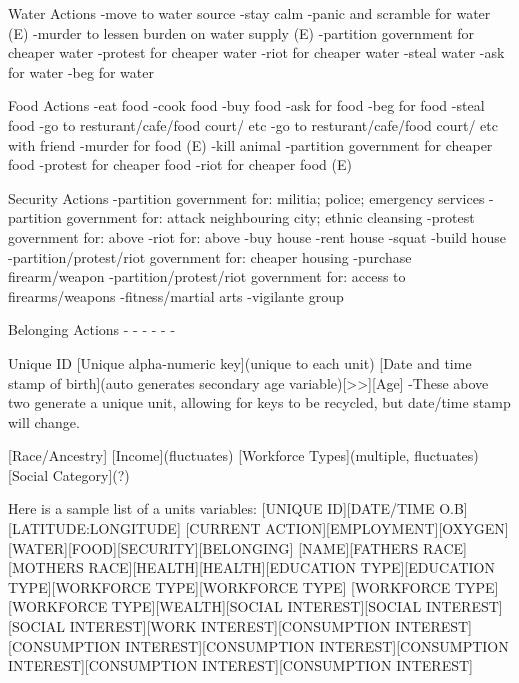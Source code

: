 Water Actions
-move to water source
-stay calm
-panic and scramble for water (E)
-murder to lessen burden on water supply (E)
-partition government for cheaper water
-protest for cheaper water
-riot for cheaper water
-steal water
-ask for water
-beg for water


Food Actions
-eat food
-cook food
-buy food
-ask for food
-beg for food
-steal food 
-go to resturant/cafe/food court/ etc
-go to resturant/cafe/food court/ etc with friend
-murder for food (E)
-kill animal
-partition government for cheaper food
-protest for cheaper food
-riot for cheaper food (E)


Security Actions
-partition government for: militia; police; emergency services
-partition government for: attack neighbouring city; ethnic cleansing
-protest government for: above
-riot for: above
-buy house
-rent house
-squat
-build house
-partition/protest/riot government for: cheaper housing
-purchase firearm/weapon
-partition/protest/riot government for: access to firearms/weapons
-fitness/martial arts
-vigilante group


Belonging Actions
-
-
-
-
-
-








Unique ID
[Unique alpha-numeric key](unique to each unit)
[Date and time stamp of birth](auto generates secondary age variable)[>>][Age]
-These above two generate a unique unit, allowing for keys to be recycled, but date/time stamp will change.

[Race/Ancestry]
[Income](fluctuates)
[Workforce Types](multiple, fluctuates)
[Social Category](?)


Here is a sample list of a units variables:
[UNIQUE ID][DATE/TIME O.B][LATITUDE:LONGITUDE]
[CURRENT ACTION][EMPLOYMENT][OXYGEN][WATER][FOOD][SECURITY][BELONGING]
[NAME][FATHERS RACE][MOTHERS RACE][HEALTH][HEALTH][EDUCATION TYPE][EDUCATION TYPE][WORKFORCE TYPE][WORKFORCE TYPE]
[WORKFORCE TYPE][WORKFORCE TYPE][WEALTH][SOCIAL INTEREST][SOCIAL INTEREST][SOCIAL INTEREST][WORK INTEREST][CONSUMPTION INTEREST][CONSUMPTION INTEREST][CONSUMPTION INTEREST][CONSUMPTION INTEREST][CONSUMPTION INTEREST][CONSUMPTION INTEREST]

